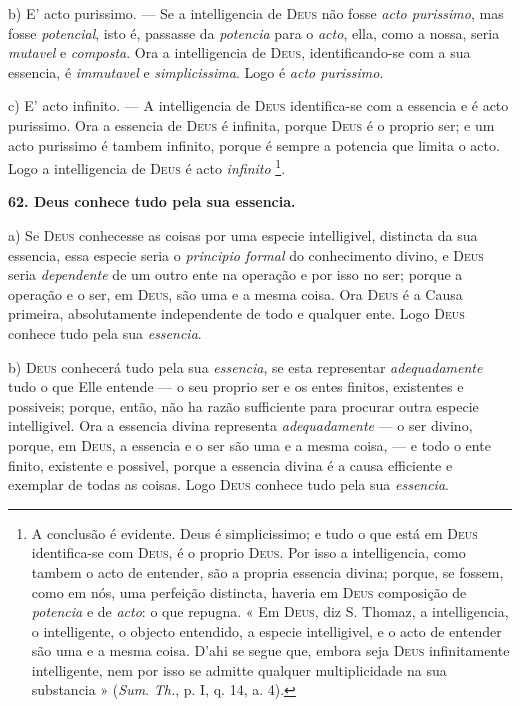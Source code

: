 b) E' acto purissimo. --- Se a intelligencia de \textsc{Deus} não fosse \emph{acto purissimo}, mas fosse \emph{potencial}, isto é, passasse da \emph{potencia} para o \emph{acto}, ella, como a nossa, seria \emph{mutavel} e \emph{composta}. Ora a intelligencia de \textsc{Deus}, identificando-se com a sua essencia, é \emph{immutavel} e \emph{simplicissima}. Logo é \emph{acto purissimo}.

c) E' acto infinito. --- A intelligencia de \textsc{Deus} identifica-se com a essencia e é acto purissimo. Ora a essencia de \textsc{Deus} é infinita, porque \textsc{Deus} é o proprio ser; e um acto purissimo é tambem infinito, porque é sempre a potencia que limita o acto. Logo a intelligencia de \textsc{Deus} é acto \emph{infinito} \footnote{A conclusão é evidente. Deus é simplicissimo; e tudo o que está em \textsc{Deus} identifica-se com \textsc{Deus}, é o proprio \textsc{Deus}. Por isso a intelligencia, como tambem o acto de entender, são a propria essencia divina; porque, se fossem, como em nós, uma perfeição distincta, haveria em \textsc{Deus} composição de \emph{potencia} e de \emph{acto}: o que repugna. « Em \textsc{Deus}, diz S. Thomaz, a intelligencia, o intelligente, o objecto entendido, a especie intelligivel, e o acto de entender são uma e a mesma coisa. D'ahi se segue que, embora seja \textsc{Deus} infinitamente intelligente, nem por isso se admitte qualquer multiplicidade na sua substancia » (\emph{Sum}. \emph{Th.}, p. I, q. 14, a. 4).}.

\textbf{62. Deus conhece tudo pela sua essencia.}

a) Se \textsc{Deus} conhecesse as coisas por uma especie intelligivel, distincta da sua essencia, essa especie seria o \emph{principio formal} do conhecimento divino, e \textsc{Deus} seria \emph{dependente} de um outro ente na operação e por isso no ser; porque a operação e o ser, em \textsc{Deus}, são uma e a mesma coisa. Ora \textsc{Deus} é a Causa primeira, absolutamente independente de todo e qualquer ente. Logo \textsc{Deus} conhece tudo pela sua \emph{essencia}.

 b) \textsc{Deus} conhecerá tudo pela sua \emph{essencia}, se esta representar \emph{adequadamente} tudo o que Elle entende --- o seu proprio ser e os entes finitos, existentes e possiveis; porque, então, não ha razão sufficiente para procurar outra especie intelligivel. Ora a essencia divina representa \emph{adequadamente} --- o ser divino, porque, em \textsc{Deus}, a essencia e o ser são uma e a mesma coisa, --- e todo o ente finito, existente e possivel, porque a essencia divina é a causa efficiente e exemplar de todas as coisas. Logo \textsc{Deus} conhece tudo pela sua \emph{essencia}.

